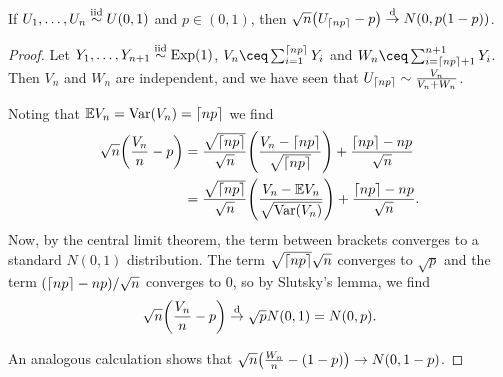 \begin{lemma}
    If $U_1, \dotsc, U_n \overset{\mathrm{iid}}{\sim} U(0, 1)$ and $p \in (0, 1)$, then $\sqrt n \qty(U_{\lceil np\rceil} - p) \overset{\mathrm{d}}{\to} N(0, p(1-p))$. 
\end{lemma}

\begin{proof}
    Let $Y_1, \dotsc, Y_{n+1} \overset{\mathrm{iid}}{\sim} \operatorname{Exp}(1)$, $V_n \ceq \sum_{i=1}^{\ceil{np}} Y_i$ and $W_n \ceq \sum_{i = \ceil{np} + 1}^{n+1} Y_i$. Then $V_n$ and $W_n$ are independent, and we have seen that $U_{\lceil np\rceil} \sim \frac{V_n}{V_n + W_n}$. 
    
    Noting that $\mathbb E V_n = \operatorname{Var}(V_n) = \lceil np\rceil$ we find
    \begin{align*}
    \sqrt{n} \qty(\frac{V_n}{n} - p) &= \frac{\sqrt{\lceil np\rceil}}{\sqrt n} \qty(\frac{V_n - \lceil np\rceil}{\sqrt{\lceil np\rceil}}) + \frac{\lceil np\rceil - np}{\sqrt n} \\
    &= \frac{\sqrt{\lceil np\rceil}}{\sqrt n}  \qty(\frac{V_n - \mathbb E V_n}{\sqrt{\operatorname{Var}(V_n)}}) +  \frac{\lceil np\rceil - np}{\sqrt n}.
    \end{align*}
    Now, by the central limit theorem, the term between brackets converges to a standard $N(0, 1)$ distribution. The term $\sqrt{\lceil np\rceil}{\sqrt n}$ converges to $\sqrt p$ and the term $(\lceil np\rceil - np)/\sqrt n$ converges to 0, so by Slutsky's lemma, we find
    \[
    \sqrt{n}\qty(\frac{V_n}{n} - p) \overset{\mathrm{d}}{\to} \sqrt p N(0, 1) = N(0, p). 
    \]
    
    An analogous calculation shows that $\sqrt n \qty(\frac{W_n}{n} - (1-p)) \to N(0, 1 - p)$. 
    

\end{proof}
